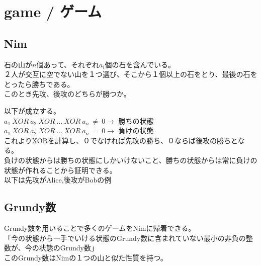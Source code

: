 \section{game / ゲーム}
\subsection{Nim}
石の山が$n$個あって、それぞれ$a_i$個の石を含んでいる。\\
２人が交互に空でない山を１つ選び、そこから１個以上の石をとり、最後の石をとったら勝ちである。\\
このとき先攻、後攻のどちらが勝つか。

以下が成立する。\\
$a_1~XOR~a_2~XOR~\ldots~XOR~a_n~\neq~0 \rightarrow$ 勝ちの状態\\
$a_1~XOR~a_2~XOR~\ldots~XOR~a_n~=~0 \rightarrow$ 負けの状態\\
これよりXORを計算し、０でなければ先攻の勝ち、０ならば後攻の勝ちとなる。\\
負けの状態からは勝ちの状態にしかいけないこと、勝ちの状態からは常に負けの状態が作れることから証明できる。\\
以下は先攻がAlice,後攻がBobの例


\subsection{Grundy数}
Grundy数を用いることで多くのゲームをNimに帰着できる。\\
「今の状態から一手でいける状態のGrundy数に含まれていない最小の非負の整数が、今の状態のGrundy数」\\
このGrundy数はNimの１つの山と似た性質を持つ。


